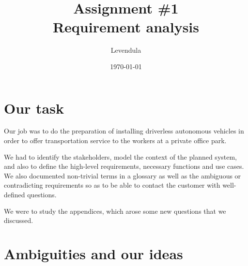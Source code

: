 \documentclass[a4paper]{article}
\title{Assignment \#1 \\ Requirement analysis}
\author{Levendula}
\date{\today}
\begin{document}


\tableofcontents
\listoffigures
\clearpage

\section{Our task}


Our job was to do the preparation of installing \gls{driverless}
\gls{autonomous} \gls{vehicle}s in order to offer \gls{transportation} service
to the workers at a private office park.

We had to identify the \gls{stakeholder}s, model the context of the planned
system, and also to define the high-level requirements, necessary functions and
use cases. We also documented non-trivial terms in a glossary as well as the
ambiguous or contradicting requirements so as to be able to contact the customer
with well-defined questions.

We were to study the appendices, which arose some new questions that we
discussed.


\section{Ambiguities and our ideas}
\end{document}

